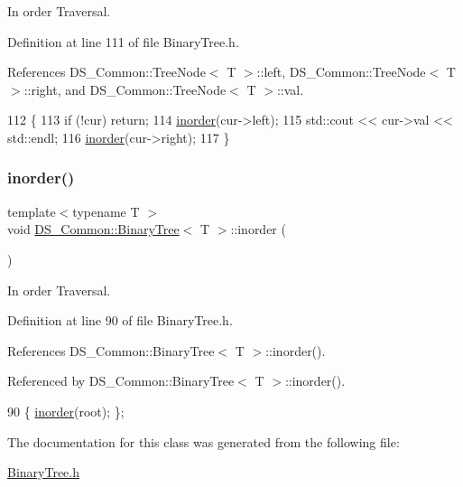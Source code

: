 In order Traversal. 



Definition at line 111 of file Binary\+Tree.\+h.



References D\+S\+\_\+\+Common\+::\+Tree\+Node$<$ T $>$\+::left, D\+S\+\_\+\+Common\+::\+Tree\+Node$<$ T $>$\+::right, and D\+S\+\_\+\+Common\+::\+Tree\+Node$<$ T $>$\+::val.


\begin{DoxyCode}
112     \{
113         \textcolor{keywordflow}{if} (!cur) \textcolor{keywordflow}{return};
114         \mbox{\hyperlink{class_d_s___common_1_1_binary_tree_ac60980a1c81e20fb73bf5ed4cfcf5e1d}{inorder}}(cur->left);
115         std::cout << cur->val << std::endl;
116         \mbox{\hyperlink{class_d_s___common_1_1_binary_tree_ac60980a1c81e20fb73bf5ed4cfcf5e1d}{inorder}}(cur->right);
117     \}
\end{DoxyCode}
\mbox{\label{class_d_s___common_1_1_binary_tree_ac60980a1c81e20fb73bf5ed4cfcf5e1d}} 
\subsubsection{\texorpdfstring{inorder()}{inorder()}\hspace{0.1cm}{\footnotesize\ttfamily [2/2]}}
{\footnotesize\ttfamily template$<$typename T $>$ \\
void \mbox{\hyperlink{class_d_s___common_1_1_binary_tree}{D\+S\+\_\+\+Common\+::\+Binary\+Tree}}$<$ T $>$\+::inorder (\begin{DoxyParamCaption}{ }\end{DoxyParamCaption})\hspace{0.3cm}{\ttfamily [inline]}}



In order Traversal. 



Definition at line 90 of file Binary\+Tree.\+h.



References D\+S\+\_\+\+Common\+::\+Binary\+Tree$<$ T $>$\+::inorder().



Referenced by D\+S\+\_\+\+Common\+::\+Binary\+Tree$<$ T $>$\+::inorder().


\begin{DoxyCode}
90 \{ \mbox{\hyperlink{class_d_s___common_1_1_binary_tree_ac60980a1c81e20fb73bf5ed4cfcf5e1d}{inorder}}(root); \};
\end{DoxyCode}


The documentation for this class was generated from the following file\+:\begin{DoxyCompactItemize}
\item 
\mbox{\hyperlink{_binary_tree_8h}{Binary\+Tree.\+h}}\end{DoxyCompactItemize}

